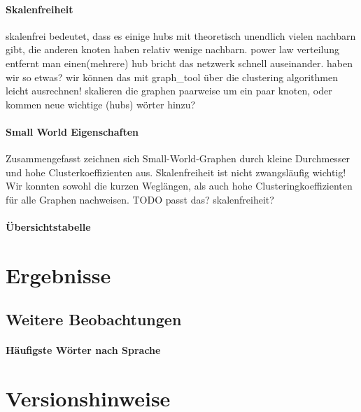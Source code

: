 \documentclass[12pt]{article}
\begin{document}
                             
\paragraph{Skalenfreiheit}
skalenfrei bedeutet, dass es einige hubs mit theoretisch unendlich vielen nachbarn gibt, die anderen knoten haben relativ wenige nachbarn. power law verteilung
entfernt man einen(mehrere) hub bricht das netzwerk schnell auseinander. haben wir so etwas? wir können das mit graph\_tool über die clustering algorithmen leicht ausrechnen!
skalieren die graphen paarweise um ein paar knoten, oder kommen neue wichtige (hubs) wörter hinzu?

\paragraph{Small World Eigenschaften}
Zusammengefasst zeichnen sich Small-World-Graphen durch kleine Durchmesser und hohe Clusterkoeffizienten aus. Skalenfreiheit ist nicht zwangsläufig wichtig! Wir konnten sowohl die kurzen Weglängen, als auch hohe Clusteringkoeffizienten für alle Graphen nachweisen. TODO passt das? skalenfreiheit? 


\paragraph{Übersichtstabelle}

\section{Ergebnisse}

\subsection{Weitere Beobachtungen}

\paragraph{H\"aufigste W\"orter nach Sprache}







\section{Versionshinweise}




\cleardoublepage
{}
\nocite{*}
%
\end{document}
